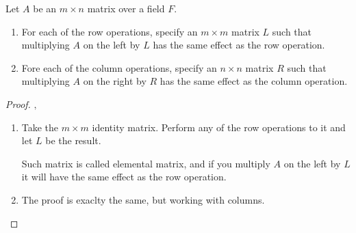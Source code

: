 \prob
{
    Let $A$ be an $m \times n$ matrix over a field $F$.
    \begin{enumerate}[label=(\roman*)]
        \item For each of the row operations, specify an $m \times m$ matrix $L$ such that
              multiplying $A$ on the left by $L$ has the same effect as the row operation.\pn
        \item Fore each of the column operations, specify an $n \times n$ matrix $R$ such that multiplying $A$ on the right
                by $R$ has the same effect as the column operation.
    \end{enumerate}
}
\begin{proof}$,$\pn
    \begin{enumerate}
        \item 
        
            Take the $m \times m$ identity matrix. Perform any of the row operations to it and let $L$
            be the result.\pn
        
            Such matrix is called elemental matrix,  and if you multiply $A$ on the left by $L$ it will have the
            same effect as the row operation.
            
        \item
            The proof is exaclty the same, but working with columns.
    \end{enumerate}
\end{proof}
